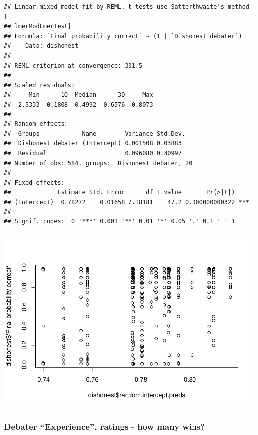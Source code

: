 \documentclass[
]{article}
\newenvironment{Shaded}{\begin{snugshade}}{\end{snugshade}}
\newcommand{\AttributeTok}[1]{\textcolor[rgb]{0.13,0.29,0.53}{#1}}
\newcommand{\FunctionTok}[1]{\textcolor[rgb]{0.13,0.29,0.53}{\textbf{#1}}}
\newcommand{\NormalTok}[1]{#1}
\newcommand{\OtherTok}[1]{\textcolor[rgb]{0.56,0.35,0.01}{#1}}
\newcommand{\SpecialCharTok}[1]{\textcolor[rgb]{0.81,0.36,0.00}{\textbf{#1}}}
\newcommand{\StringTok}[1]{\textcolor[rgb]{0.31,0.60,0.02}{#1}}
\begin{document}
\begin{verbatim}
## Linear mixed model fit by REML. t-tests use Satterthwaite's method [
## lmerModLmerTest]
## Formula: `Final probability correct` ~ (1 | `Dishonest debater`)
##    Data: dishonest
## 
## REML criterion at convergence: 301.5
## 
## Scaled residuals: 
##     Min      1Q  Median      3Q     Max 
## -2.5333 -0.1808  0.4992  0.6576  0.8073 
## 
## Random effects:
##  Groups            Name        Variance Std.Dev.
##  Dishonest debater (Intercept) 0.001508 0.03883 
##  Residual                      0.096080 0.30997 
## Number of obs: 584, groups:  Dishonest debater, 20
## 
## Fixed effects:
##             Estimate Std. Error      df t value       Pr(>|t|)    
## (Intercept)  0.78272    0.01658 7.18181    47.2 0.000000000322 ***
## ---
## Signif. codes:  0 '***' 0.001 '**' 0.01 '*' 0.05 '.' 0.1 ' ' 1
\end{verbatim}

\begin{Shaded}
\end{Shaded}

\includegraphics{debate-2309_files/figure-latex/deprecated-1.pdf}

\subsubsection{Debater ``Experience'', ratings - how many
wins?}\label{debater-experience-ratings---how-many-wins}
\end{document}

